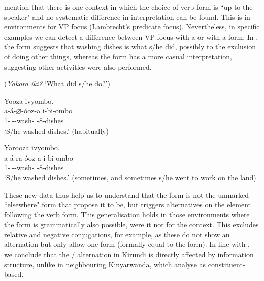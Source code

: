 \documentclass[output=paper]{langscibook}
\begin{document}
\citet{NshemezimanaBostoen2017} mention that there is one context in which the choice of verb form is ``up to the speaker" and no systematic difference in interpretation can be found. This is in environments for VP focus (Lambrecht’s predicate focus). Nevertheless, in specific examples we can detect a difference between VP focus with a \CJ{} or with a \DJ{} form. In , the \CJ{} form suggests that washing dishes is what s/he did, possibly to the exclusion of doing other things, whereas the \DJ{} form has a more casual interpretation, suggesting other activities were also performed. 

\ea
\label{bkm:Ref76375155}(\textit{Yakora iki?} ‘What did s/he do?’)

\ea
\begin{xlist}
\exi{\CJ{}}
Yooza ivyombo.\\
\gll
a-á-$\varnothing$-óoz-a  i-bi-ombo\\
1\SM-\RMT.\PST{}-\CJ{}-wash-\FV{}  \AUG{}-8-dishes\\
\glt
‘S/he washed dishes.’ (habitually)\\

\end{xlist}

\ex
\begin{xlist}
\exi{\DJ{}}
Yarooza ivyombo.\\
\gll
a-á-ra-óoz-a  i-bi-ombo\\
1\SM{}-\RMT.\PST{}-\DJ{}-wash-\FV{}  \AUG{}-8-dishes\\
\glt
‘S/he washed dishes.’ (sometimes, and sometimes s/he went to work on the land)\\

\end{xlist}

\z
\z


These new data thus help us to understand that the \CJ{} form is not the unmarked ``elsewhere" form that \citet{NshemezimanaBostoen2017} propose it to be, but triggers alternatives on the element following the \CJ{} verb form. This generalisation holds in those environments where the \DJ{} form is grammatically also possible, were it not for the context. This excludes relative and negative conjugations, for example, as these do not show an alternation but only allow one form (formally equal to the \CJ{} form). In line with \citet{NshemezimanaBostoen2017}, we conclude that the \CJ{}/\DJ{} alternation in Kirundi is directly affected by information structure, unlike in neighbouring Kinyarwanda, which \citet{NgobokaZeller2017} analyse as constituent-based.
\end{document}
